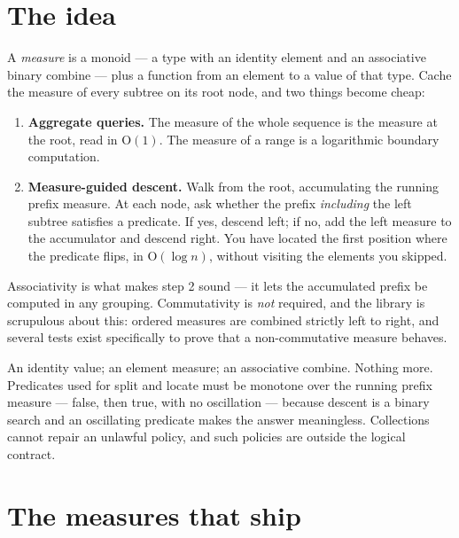 \documentclass[11pt,twoside,openright]{book}
\newcommand{\term}[1]{\textit{#1}}
\newcommand{\bigoh}[1]{$\mathrm{O}(#1)$}
\begin{document}
\section{The idea}

A \term{measure} is a monoid --- a type with an identity element and an
associative binary combine --- plus a function from an element to a value of
that type. Cache the measure of every subtree on its root node, and two things
become cheap:

\begin{enumerate}
\item \textbf{Aggregate queries.} The measure of the whole sequence is the
measure at the root, read in \bigoh{1}. The measure of a range is a logarithmic
boundary computation.
\item \textbf{Measure-guided descent.} Walk from the root, accumulating the
running prefix measure. At each node, ask whether the prefix \emph{including}
the left subtree satisfies a predicate. If yes, descend left; if no, add the left
measure to the accumulator and descend right. You have located the first
position where the predicate flips, in \bigoh{\log n}, without visiting the
elements you skipped.
\end{enumerate}

Associativity is what makes step 2 sound --- it lets the accumulated prefix be
computed in any grouping. Commutativity is \emph{not} required, and the library
is scrupulous about this: ordered measures are combined strictly left to right,
and several tests exist specifically to prove that a non-commutative measure
behaves.

\begin{contractbox}
An identity value; an element measure; an associative combine. Nothing more.
Predicates used for split and locate must be monotone over the running prefix
measure --- false, then true, with no oscillation --- because descent is a binary
search and an oscillating predicate makes the answer meaningless. Collections
cannot repair an unlawful policy, and such policies are outside the logical
contract.
\end{contractbox}

\section{The measures that ship}
\end{document}
